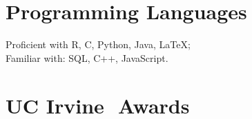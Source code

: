 \documentclass[margin]{res}
\begin{document}
\begin{resume}


\section{Programming Languages}

Proficient with R, C, Python, Java, \LaTeX;\\ Familiar with:  SQL, C++, JavaScript.

%
%

 

\section{UC Irvine\,\, Awards}


\end{resume}
\end{document}

